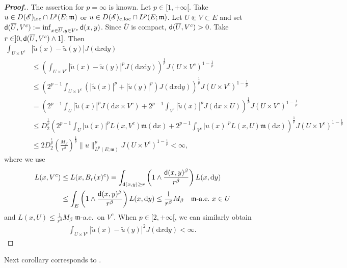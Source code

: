 \documentclass[12pt,a4paper]{article}
\renewcommand{\d}{\mathrm{d}}
\newcommand{\m}{\mathfrak{m} }
\newcommand{\loc}{{\rm loc}}
\newcommand{\1}{{\bf 1}}
\begin{document}
\begin{proof}[{\bf Proof.}]
The assertion for $p=\infty$ is known. Let $p\in[1,+\infty[$. Take $u\in D(\mathscr{E})_{\loc}\cap L^p(E;{\m})$ or 
$u\in D(\mathscr{E})_{e,\loc}\cap L^p(E;{\m})$.  
Let $U\Subset V\subset E$ and set ${\sf d}(\overline{U},V^c):=\inf_{x\in \overline{U},y\in V^c}{\sf d}(x,y)$. 
Since $\overline{U}$ is compact, ${\sf d}(\overline{U},V^c)>0$. 
Take $r\in]0,{\sf d}(\overline{U},V^c)\land1]$. Then
\begin{align*}
\int_{U\times V^c}&|\tilde{u}(x)-\tilde{u}(y)|J({\d} x{\d} y)\\&\leq 
\left(\int_{U\times V^c}|\tilde{u}(x)-\tilde{u}(y)|^pJ({\d} x{\d} y) \right)^{\frac{1}{p}}J(U\times V^c)^{1-\frac{1}{p}}\\
&\leq \left(2^{p-1}\int_{U\times V^c}(|\tilde{u}(x)|^p+|\tilde{u}(y)|^p)J({\d} x{\d} y) \right)^{\frac{1}{p}}J(U\times V^c)^{1-\frac{1}{p}}\\
&=
\left(2^{p-1}\int_U|\tilde{u}(x)|^pJ({\d} x\times V^c)+2^{p-1}\int_{V^c}|\tilde{u}(x)|^pJ({\d} x\times U)
 \right)^{\frac{1}{p}}J(U\times V^c)^{1-\frac{1}{p}}\\
&\leq D_2^{\frac{1}{p}}\left(2^{p-1}\int_U|u(x)|^pL(x,V^c){\m}({\d} x)+2^{p-1}\int_{V^c}|u(x)|^p L(x,U){\m}({\d} x)
 \right)^{\frac{1}{p}}J(U\times V^c)^{1-\frac{1}{p}}\\
 &\leq 2 D_2^{\frac{1}{p}} \left(\frac{M_{\beta}}{r^{\beta}}\right)^{\frac{1}{p}}\|u\|^p_{L^p(E;{\m})}J(U\times V^c)^{1-\frac{1}{p}}<\infty,
\end{align*}
where we use 
\begin{align*}
L(x,V^c)&\leq L(x,B_r(x)^c)=\int_{{\sf d}(x,y)\geq r}\left(1\land \frac{{\sf  d}(x,y)^{\beta}}{r^{\beta}} \right)L(x,{\d} y)\\
&\leq \int_E\left(1\land \frac{{\sf  d}(x,y)^{\beta}}{r^{\beta}} \right)L(x,{\d} y)\leq\frac{1}{r^{\beta}}M_{\beta}\quad{\m}\text{-a.e.~}x\in U
\end{align*}
and $L(x,U)\leq \frac{1}{r^{\beta}}M_{\beta}$ ${\m}$-a.e.~on $V^c$. 
When $p\in[2,+\infty[$, we can similarly obtain
\begin{align*}
\int_{U\times V^c}|\tilde{u}(x)-\tilde{u}(y)|^2J({\d} x{\d} y)<\infty.
\end{align*}
\end{proof}
Next corollary corresponds to \cite[Lemma~2.2]{MasamuneUemura2}.
\end{document}
